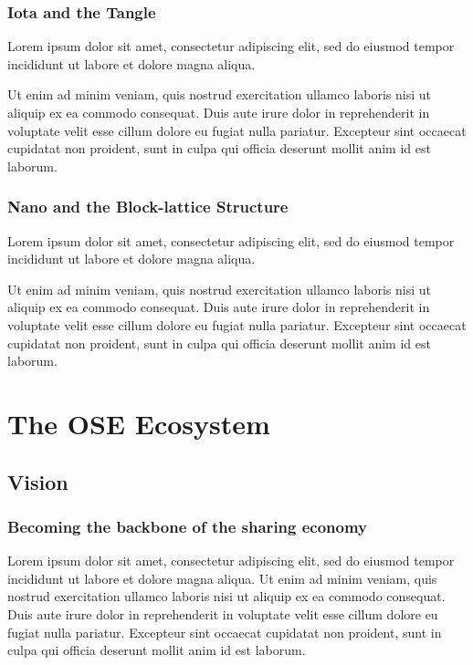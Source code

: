 \documentclass[a4paper]{article}
\begin{document}
\subsubsection{Iota and the Tangle}

Lorem ipsum dolor sit amet, consectetur adipiscing elit, sed do eiusmod tempor incididunt ut labore et dolore magna aliqua.

Ut enim ad minim veniam, quis nostrud exercitation ullamco laboris nisi ut aliquip ex ea commodo consequat. Duis aute irure dolor in reprehenderit in voluptate velit esse cillum dolore eu fugiat nulla pariatur. Excepteur sint occaecat cupidatat non proident, sunt in culpa qui officia deserunt mollit anim id est laborum.

\subsubsection{Nano and the Block-lattice Structure}

Lorem ipsum dolor sit amet, consectetur adipiscing elit, sed do eiusmod tempor incididunt ut labore et dolore magna aliqua.

Ut enim ad minim veniam, quis nostrud exercitation ullamco laboris nisi ut aliquip ex ea commodo consequat. Duis aute irure dolor in reprehenderit in voluptate velit esse cillum dolore eu fugiat nulla pariatur. Excepteur sint occaecat cupidatat non proident, sunt in culpa qui officia deserunt mollit anim id est laborum.

\newpage

\section{The OSE Ecosystem}

\subsection{Vision}

\subsubsection{Becoming the backbone of the sharing economy}

Lorem ipsum dolor sit amet, consectetur adipiscing elit, sed do eiusmod tempor incididunt ut labore et dolore magna aliqua. Ut enim ad minim veniam, quis nostrud exercitation ullamco laboris nisi ut aliquip ex ea commodo consequat. Duis aute irure dolor in reprehenderit in voluptate velit esse cillum dolore eu fugiat nulla pariatur. Excepteur sint occaecat cupidatat non proident, sunt in culpa qui officia deserunt mollit anim id est laborum.
\end{document}
